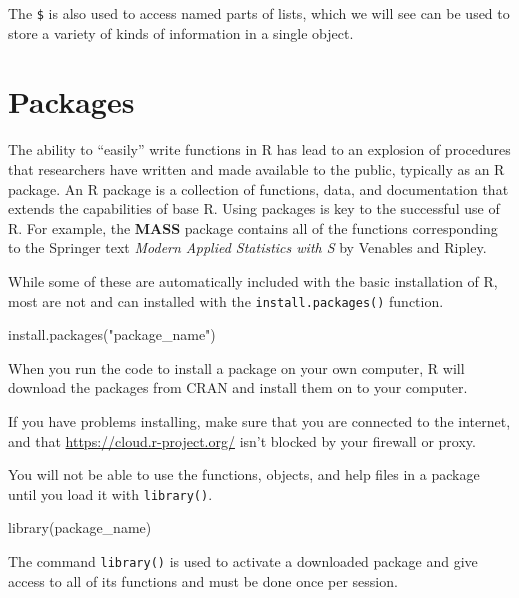 \documentclass[
]{book}
\newenvironment{Shaded}{\begin{snugshade}}{\end{snugshade}}
\newcommand{\FunctionTok}[1]{\textcolor[rgb]{0.00,0.00,0.00}{#1}}
\newcommand{\NormalTok}[1]{#1}
\newcommand{\StringTok}[1]{\textcolor[rgb]{0.31,0.60,0.02}{#1}}
\begin{document}
The \texttt{\$} is also used to access named parts of lists, which we will see can be used to store a variety of kinds of information in a single object.

\hypertarget{packages}{%
\section{Packages}\label{packages}}

The ability to ``easily'' write functions in R has lead to an explosion of procedures that researchers have written and made available to the public, typically as an R package. An R package is a collection of functions, data, and documentation that extends the capabilities of base R. Using packages is key to the successful use of R. For example, the \textbf{MASS} package contains all of the functions corresponding to the Springer text \emph{Modern Applied Statistics with S} by Venables and Ripley.

While some of these are automatically included with the basic installation of R, most are not and can installed with the \texttt{install.packages()} function.

\begin{Shaded}
\begin{Highlighting}[]
\FunctionTok{install.packages}\NormalTok{(}\StringTok{"package\_name"}\NormalTok{)}
\end{Highlighting}
\end{Shaded}

When you run the code to install a package on your own computer, R will download the packages from CRAN and install them on to your computer.

If you have problems installing, make sure that you are connected to the internet, and that \url{https://cloud.r-project.org/} isn't blocked by your firewall or proxy.

You will not be able to use the functions, objects, and help files in a package until you load it with \texttt{library()}.

\begin{Shaded}
\begin{Highlighting}[]
\FunctionTok{library}\NormalTok{(package\_name)}
\end{Highlighting}
\end{Shaded}

The command \texttt{library()} is used to activate a downloaded package and give access to all of its functions and must be done once per session.
\end{document}
